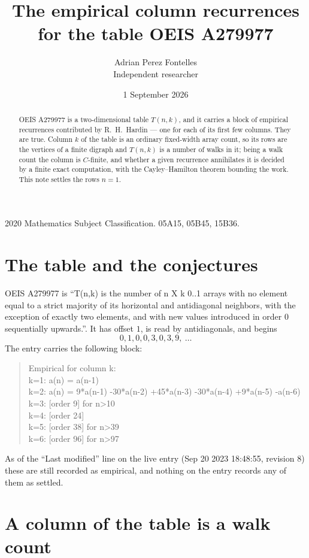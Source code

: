 \documentclass[11pt,a4paper]{article}
\title{The empirical column recurrences for the table OEIS A279977}
\author{Adrian Perez Fontelles\\ \small Independent researcher}
\date{1 September 2026}
\theoremstyle{plain}
\theoremstyle{definition}
\begin{document}
\maketitle

\begin{abstract}
OEIS A279977 is a two-dimensional table $T(n,k)$, and it carries a block of empirical
recurrences contributed by R.~H.~Hardin --- one for each of its first few columns. They are
true. Column $k$ of the table is an ordinary fixed-width array count, so its rows are the
vertices of a finite digraph and $T(n,k)$ is a number of walks in it; being a walk count the
column is $C$-finite, and whether a given recurrence annihilates it is decided by a finite
exact computation, with the Cayley--Hamilton theorem bounding the work. This note settles the rows $n=1$.
\end{abstract}

\noindent\small 2020 Mathematics Subject Classification. 05A15, 05B45, 15B36.\normalsize

\section{The table and the conjectures}

OEIS A279977 is ``T(n,k) is the number of n X k 0..1 arrays with no element equal to a strict majority of its horizontal and antidiagonal neighbors, with the exception of exactly two elements, and with new values introduced in order 0 sequentially upwards.''. It has offset $1$, is
read by antidiagonals, and begins
\[
0, 1, 0, 0, 3, 0, 3, 9,\ \dots
\]
The entry carries the following block:
\begin{quote}\small
Empirical for column k:\\
k=1: a(n) = a(n-1)\\
k=2: a(n) = 9*a(n-1) -30*a(n-2) +45*a(n-3) -30*a(n-4) +9*a(n-5) -a(n-6)\\
k=3: [order 9] for n>10\\
k=4: [order 24]\\
k=5: [order 38] for n>39\\
k=6: [order 96] for n>97\\
\end{quote}
As of the ``Last modified'' line on the live entry (Sep 20 2023 18:48:55, revision 8) these are still
recorded as empirical, and nothing on the entry records any of them as settled.

\section{A column of the table is a walk count}
\end{document}
